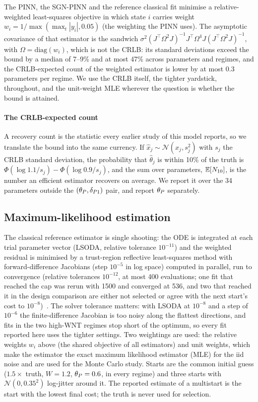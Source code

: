 The PINN, the SGN-PINN and the reference classical fit minimise a
relative-weighted least-squares objective in which state $i$ carries weight $w_i=1/\max(\max_t|y_i|,0.05)$ (the
weighting the PINN uses). The asymptotic covariance of that estimator is the
sandwich $\sigma^2(J^\top \Omega^2J)^{-1}J^\top \Omega^4J(J^\top \Omega^2J)^{-1}$, with $\Omega=\mathrm{diag}(w_i)$, which is not
the CRLB: its standard deviations exceed the bound by a median of 7--9\% and at
most 47\% across parameters and regimes, and the CRLB-expected count of the
weighted estimator is lower by at most 0.3 parameters per regime. We use the
CRLB itself, the tighter yardstick, throughout, and the unit-weight MLE wherever
the question is whether the bound is attained.

\paragraph{The CRLB-expected count} A recovery count is the statistic every
earlier study of this model reports, so we translate the bound into the same
currency. If $\hat x_j\sim\mathcal{N}(x_j,s_j^2)$ with $s_j$ the CRLB standard
deviation, the probability that $\hat\theta_j$ is within 10\% of the truth is
$\Phi(\log 1.1/s_j)-\Phi(\log 0.9/s_j)$, and the sum over parameters,
$\mathbb{E}[N_{10}]$, is the number an efficient estimator recovers on average.
We report it over the 34 parameters outside the $(\theta_P,\delta_{P1})$ pair, and report
$\theta_P$ separately.

\subsection{Maximum-likelihood estimation}
\label{sec:m-mle}

The classical reference estimator is single shooting: the ODE is integrated at
each trial parameter vector (LSODA, relative tolerance $10^{-11}$) and the
weighted residual is minimised by a trust-region reflective least-squares
method with forward-difference Jacobians (step $10^{-5}$ in log space) computed
in parallel, run to convergence (relative tolerances $10^{-12}$, at most 400
evaluations; one fit that reached the cap was rerun with 1500 and converged at
536, and two that reached it in the design comparison are either not selected
or agree with the next start's cost to $10^{-8}$)~\citep{virtanen2020scipy}. The solver tolerance matters: with
LSODA at $10^{-8}$ and a step of $10^{-6}$ the finite-difference Jacobian is too
noisy along the flattest directions, and fits in the two high-WNT regimes stop
short of the optimum, so every fit reported here uses the tighter settings. Two
weightings are used: the relative weights $w_i$ above (the shared objective of
all estimators) and unit weights, which make the estimator the exact maximum
likelihood estimator (MLE) for the iid noise and are used for the Monte Carlo
study. Starts are the common initial guess ($1.5\times$ truth, $W=1.2$,
$\theta_P=0.6$, in every regime) and three starts with $\mathcal{N}(0,0.35^2)$
log-jitter around it. The reported estimate of a multistart is the start with the
lowest final cost; the truth is never used for selection.

